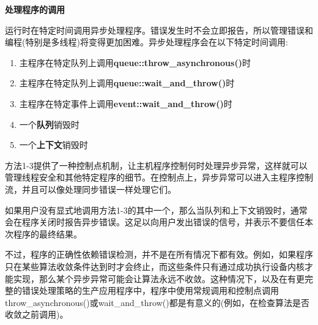 \hspace*{\fill} \par %
\textbf{处理程序的调用}

运行时在特定时间调用异步处理程序。错误发生时不会立即报告，所以管理错误和编程(特别是多线程)将变得更加困难。异步处理程序会在以下特定时间调用:\par

\begin{enumerate}
	\item 主程序在特定队列上调用\textbf{queue::throw\_asynchronous()}时
	\item 主程序在特定队列上调用\textbf{queue::wait\_and\_throw()}时
	\item 主程序在特定事件上调用\textbf{event::wait\_and\_throw()}时
	\item 一个\textbf{队列}销毁时
	\item 一个\textbf{上下文}销毁时
\end{enumerate}

方法1-3提供了一种控制点机制，让主机程序控制何时处理异步异常，这样就可以管理线程安全和其他特定程序的细节。在控制点上，异步异常可以进入主程序控制流，并且可以像处理同步错误一样处理它们。\par

如果用户没有显式地调用方法1-3的其中一个，那么当队列和上下文销毁时，通常会在程序关闭时报告异步错误。这足以向用户发出错误的信号，并表示不要信任本次程序的最终结果。\par

不过，程序的正确性依赖错误检测，并不是在所有情况下都有效。例如，如果程序只在某些算法收敛条件达到时才会终止，而这些条件只有通过成功执行设备内核才能实现，那么某个异步异常可能会让算法永远不收敛。这种情况下，以及在有更完整的错误处理策略的生产应用程序中，程序中使用常规调用和控制点调用throw\_asynchronous()或wait\_and\_throw()都是有意义的(例如，在检查算法是否收敛之前调用)。\par




















